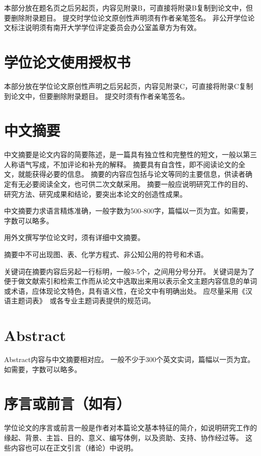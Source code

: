 本部分放在题名页之后另起页，内容见附录B，可直接将附录B复制到论文中，但要删除附录题目。
提交时学位论文原创性声明须有作者亲笔签名。
非公开学位论文标注说明须有南开大学学位评定委员会办公室盖章方为有效。

\section{学位论文使用授权书}

本部分放在学位论文原创性声明之后另起页，内容见附录C，可直接将附录C复制到论文中，但要删除附录题目。
提交时须有作者亲笔签名。

\section{中文摘要}

中文摘要是论文内容的简要陈述，是一篇具有独立性和完整性的短文，一般以第三人称语气写成，不加评论和补充的解释。
摘要具有自含性，即不阅读论文的全文，就能获得必要的信息。
摘要的内容应包括与论文等同的主要信息，供读者确定有无必要阅读全文，也可供二次文献采用。
摘要一般应说明研究工作的目的、研究方法、研究成果和结论，要突出本论文的创造性成果。

中文摘要力求语言精炼准确，一般字数为500-800字，篇幅以一页为宜。如需要，字数可以略多。

用外文撰写学位论文时，须有详细中文摘要。

摘要中不可出现图、表、化学方程式、非公知公用的符号和术语。

关键词在摘要内容后另起一行标明，一般3-5个，之间用分号分开。
关键词是为了便于做文献索引和检索工作而从论文中选取出来用以表示全文主题内容信息的单词或术语，应体现论文特色，具有语义性，在论文中有明确出处。
应尽量采用《汉语主题词表》~\cite{REF00000003}或各专业主题词表提供的规范词。

\section{Abstract}

Abstract内容与中文摘要相对应。
一般不少于300个英文实词，篇幅以一页为宜。
如需要，字数可以略多。

\section{序言或前言（如有）}

学位论文的序言或前言一般是作者对本篇论文基本特征的简介，如说明研究工作的缘起、背景、主旨、目的、意义、编写体例，以及资助、支持、协作经过等。
这些内容也可以在正文引言（绪论）中说明。

